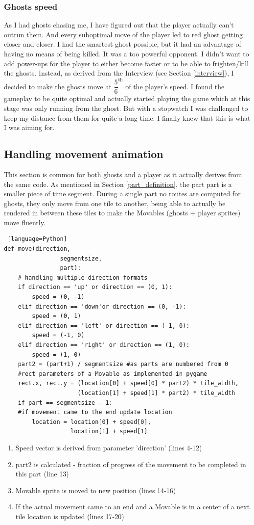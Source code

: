 \documentclass[11pt,a4paper,notitlepage]{report}
\newcommand{\dsubsection}[1]{\FloatBarrier \subsection{#1}}
\begin{document}
				\subsubsection{Ghosts speed}
					As I had ghosts chasing me, I have figured out that the player actually can't outrun them. And every suboptimal move of the player led to red ghost getting closer and closer. I had the smartest ghost possible, but it had an advantage of having no means of being killed. It was a too powerful opponent. I didn't want to add power-ups for the player to either become faster or to be able to frighten/kill the ghosts. Instead, as derived from the Interview (see Section \ref{interview}), I decided to make the ghosts move at $\dfrac{5}{6}^{\text{th}}$ of the player's speed. I found the gameplay to be quite optimal and actually started playing the game which at this stage was only running from the ghost. But with a stopwatch I was challenged to keep my distance from them for quite a long time. I finally knew that this is what I was aiming for.
			\dsubsection{Handling movement animation}
				This section is common for both ghosts and a player as it actually derives from the same code. As mentioned in Section \ref{part_definition}, the part part is a smaller piece of time segment. During a single part no routes are computed for ghosts, they only move from one tile to another, being able to actually be rendered in between these tiles to make the Movables (ghosts + player sprites) move fluently.
				\begin{lstlisting} [language=Python]
def move(direction,
				segmentsize,
				part):
	# handling multiple direction formats
    if direction == 'up' or direction == (0, 1):
        speed = (0, -1)
    elif direction == 'down'or direction == (0, -1):
        speed = (0, 1)
    elif direction == 'left' or direction == (-1, 0):
        speed = (-1, 0)
    elif direction == 'right' or direction == (1, 0):
        speed = (1, 0)
    part2 = (part+1) / segmentsize #as parts are numbered from 0
    #rect parameters of a Movable as implemented in pygame
    rect.x, rect.y = (location[0] + speed[0] * part2) * tile_width,
                     (location[1] + speed[1] * part2) * tile_width
    if part == segmentsize - 1:
    #if movement came to the end update location
        location = location[0] + speed[0],
                   location[1] + speed[1]
				\end{lstlisting}
				\begin{enumerate}
					\item
						Speed vector is derived from parameter 'direction' (lines 4-12)
					\item
						part2 is calculated - fraction of progress of the movement to be completed in this part (line 13)\
					\item
						Movable sprite is moved to new position (lines 14-16)
					\item
						If the actual movement came to an end and a Movable is in a center of a next tile location is updated (lines 17-20)
				\end{enumerate}
\end{document}
